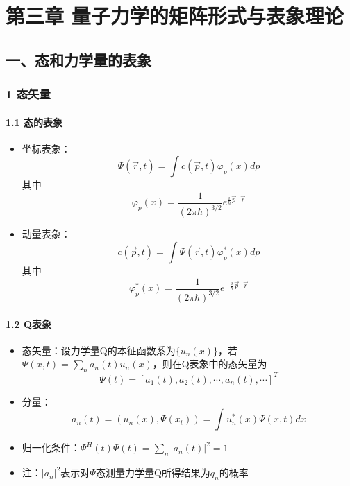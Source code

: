 \documentclass[UTF8,twocolumn]{ctexart}
\date{}
\providecommand{\tightlist}{%
  \setlength{\itemsep}{0pt}\setlength{\parskip}{0pt}}
\let\oldparagraph\paragraph
\renewcommand{\paragraph}[1]{\oldparagraph{#1}\mbox{}}
\begin{document}
\hypertarget{ux7b2cux4e09ux7ae0-ux91cfux5b50ux529bux5b66ux7684ux77e9ux9635ux5f62ux5f0fux4e0eux8868ux8c61ux7406ux8bba}{%
\section{第三章{ }量子力学的矩阵形式与表象理论}\label{ux7b2cux4e09ux7ae0-ux91cfux5b50ux529bux5b66ux7684ux77e9ux9635ux5f62ux5f0fux4e0eux8868ux8c61ux7406ux8bba}}

\hypertarget{ux4e00ux6001ux548cux529bux5b66ux91cfux7684ux8868ux8c61}{%
\subsection{一、态和力学量的表象}\label{ux4e00ux6001ux548cux529bux5b66ux91cfux7684ux8868ux8c61}}

\hypertarget{ux6001ux77e2ux91cf}{%
\subsubsection{1 态矢量}\label{ux6001ux77e2ux91cf}}

\hypertarget{ux6001ux7684ux8868ux8c61}{%
\paragraph{ 1.1 态的表象}\label{ux6001ux7684ux8868ux8c61}}

\begin{itemize}
\tightlist
\item
  坐标表象：
  \[\Psi(\vec{r},t)=\int c(\vec{p},t)\varphi_p(x)dp\]
  其中
  \[\varphi_p(x)=\frac{1}{(2\pi\hbar)^{3/2}}e^{\frac{i}{\hbar}\vec{p}\cdot\vec{r}}\]
\item
  动量表象：
  \[c(\vec{p},t)=\int\Psi(\vec{r},t)\varphi_p^*(x)dp\]
  其中
  \[\varphi_p^*(x)=\frac{1}{(2\pi\hbar)^{3/2}}e^{-\frac{i}{\hbar}\vec{p}\cdot\vec{r}}\]
\end{itemize}

\hypertarget{qux8868ux8c61}{%
\paragraph{ 1.2 Q表象}\label{qux8868ux8c61}}

\begin{itemize}
\tightlist
\item
  态矢量：设力学量Q的本征函数系为\(\{u_n(x)\}\)，若\(\Psi(x,t)=\sum_na_n(t)u_n(x)\)，则在Q表象中的态矢量为
  \[\Psi(t)=[a_1(t),a_2(t),\cdots,a_n(t),\cdots]^T\]
\item
  分量：
  \[a_n(t)=(u_n(x),\Psi(x_t))=\int u_n^*(x)\Psi(x,t)dx\]
\item
  归一化条件：\(\Psi^H(t)\Psi(t)=\sum_n|a_n(t)|^2=1\)
\item
  注：\(|a_n|^2\)表示对\(\Psi\)态测量力学量Q所得结果为\(q_n\)的概率
\end{itemize}
\end{document}
